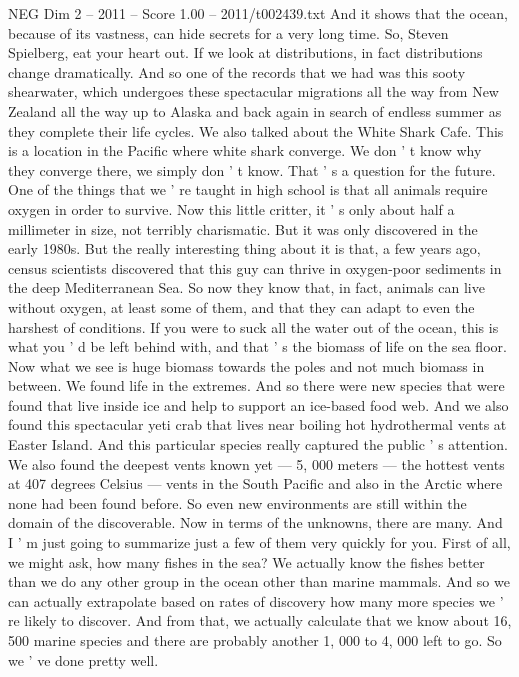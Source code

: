 \begin{textsample}{NEG Dim 2 – 2011 – Score 1.00 – 2011/t002439.txt}
And it shows that the ocean, because of its vastness, can hide secrets for a very long time.
So, Steven Spielberg, eat your heart out.
If we look at distributions, in fact distributions change dramatically.
And so one of the records that we had was this sooty shearwater, which undergoes these spectacular migrations all the way from New Zealand all the way up to Alaska and back again in search of endless summer as they complete their life cycles.
We also talked about the White Shark Cafe.
This is a location in the Pacific where white shark converge.
We don ' t know why they converge there, we simply don ' t know.
That ' s a question for the future.
One of the things that we ' re taught in high school is that all animals require oxygen in order to survive.
Now this little critter, it ' s only about half a millimeter in size, not terribly charismatic.
But it was only discovered in the early 1980s.
But the really interesting thing about it is that, a few years ago, census scientists discovered that this guy can thrive in oxygen-poor sediments in the deep Mediterranean Sea.
So now they know that, in fact, animals can live without oxygen, at least some of them, and that they can adapt to even the harshest of conditions.
If you were to suck all the water out of the ocean, this is what you ' d be left behind with, and that ' s the biomass of life on the sea floor.
Now what we see is huge biomass towards the poles and not much biomass in between.
We found life in the extremes.
And so there were new species that were found that live inside ice and help to support an ice-based food web.
And we also found this spectacular yeti crab that lives near boiling hot hydrothermal vents at Easter Island.
And this particular species really captured the public ' s attention.
We also found the deepest vents known yet — 5, 000 meters — the hottest vents at 407 degrees Celsius — vents in the South Pacific and also in the Arctic where none had been found before.
So even new environments are still within the domain of the discoverable.
Now in terms of the unknowns, there are many.
And I ' m just going to summarize just a few of them very quickly for you.
First of all, we might ask, how many fishes in the sea?
We actually know the fishes better than we do any other group in the ocean other than marine mammals.
And so we can actually extrapolate based on rates of discovery how many more species we ' re likely to discover.
And from that, we actually calculate that we know about 16, 500 marine species and there are probably another 1, 000 to 4, 000 left to go.
So we ' ve done pretty well.

\end{textsample}
